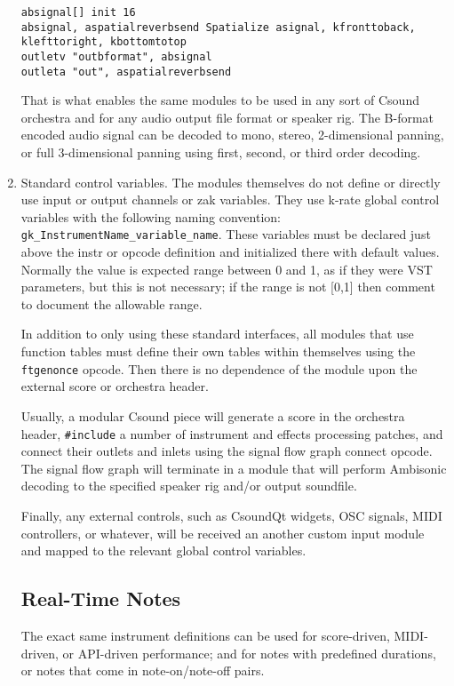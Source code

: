 \documentclass[12pt,letterpaper,onecolumn]{scrartcl}
\begin{document}
\begin{enumerate}
\begin{lstlisting}
absignal[] init 16
absignal, aspatialreverbsend Spatialize asignal, kfronttoback, klefttoright, kbottomtotop
outletv "outbformat", absignal
outleta "out", aspatialreverbsend
\end{lstlisting}

That is what enables the same modules to be used in any sort of Csound orchestra and for any audio output file format or speaker rig. The B-format encoded audio signal can be decoded to mono, stereo, 2-dimensional panning, or full 3-dimensional panning using first, second, or third order decoding. 

		\item Standard control variables. The modules themselves do not define or directly use input or output channels or zak variables. They use k-rate global control variables with the following naming convention: \texttt{gk\_InstrumentName\_variable\_name}. These variables must be declared just above the instr or opcode definition and initialized there with default values. Normally the value is expected range between 0 and 1, as if they were VST parameters, but this is not necessary; if the range is not [0,1] then comment to document the allowable range.
		
In addition to only using these standard interfaces, all modules that use function tables must define their own tables within themselves using the \texttt{ftgenonce} opcode. Then there is no dependence of the module upon the external score or orchestra header.
		
Usually, a modular Csound piece will generate a score in the orchestra header, \texttt{\#include} a number of instrument and effects processing patches, and connect their outlets and inlets using the signal flow graph connect opcode. The signal flow graph will terminate in a module that will perform Ambisonic decoding to the specified speaker rig and/or output soundfile.

Finally, any external controls, such as CsoundQt widgets, OSC signals, MIDI controllers, or whatever, will be received an another custom input module and mapped to the relevant global control variables.

\subsection{Real-Time Notes}

The exact same instrument definitions can be used for score-driven, MIDI-driven, or API-driven performance; and for notes with predefined durations, or notes that come in note-on/note-off pairs.


\end{enumerate}
\end{document}
